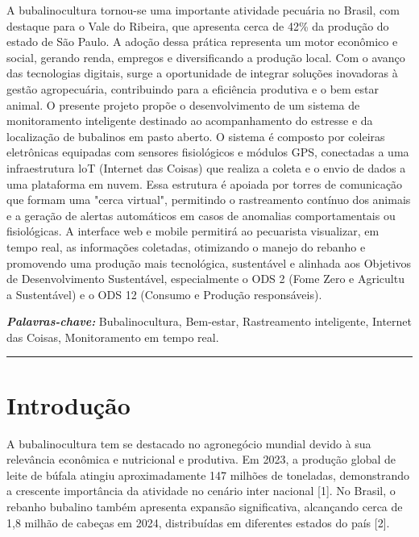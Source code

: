 \documentclass[11pt,a4paper]{article}
\begin{document}
A bubalinocultura tornou-se uma importante atividade pecuária no Brasil, com destaque para o Vale do Ribeira, que apresenta cerca de 42\% da produção do estado de São Paulo. A adoção dessa prática representa um motor econômico e social, gerando renda, empregos e diversificando a produção local. Com o avanço das tecnologias digitais, surge a oportunidade de integrar soluções inovadoras à gestão agropecuária, contribuindo para a eficiência produtiva e o bem estar animal. O presente projeto propõe o desenvolvimento de um sistema de monitoramento inteligente destinado ao acompanhamento do estresse e da localização de bubalinos em pasto aberto. O sistema é composto por coleiras eletrônicas equipadas com sensores fisiológicos e módulos GPS, conectadas a uma infraestrutura loT (Internet das Coisas) que realiza a coleta e o envio de dados a uma plataforma em nuvem. Essa estrutura é apoiada por torres de comunicação que formam uma "cerca virtual", permitindo o rastreamento contínuo dos animais e a geração de alertas automáticos em casos de anomalias comportamentais ou fisiológicas. A interface web e mobile permitirá ao pecuarista visualizar, em tempo real, as informações coletadas, otimizando o manejo do rebanho e promovendo uma produção mais tecnológica, sustentável e alinhada aos Objetivos de Desenvolvimento Sustentável, especialmente o ODS 2 (Fome Zero e Agricultu a Sustentável) e o ODS 12 (Consumo e Produção responsáveis).

\vspace{0.3cm}
\noindent\textit{\textbf{Palavras-chave:}} Bubalinocultura, Bem-estar, Rastreamento inteligente, Internet das Coisas, Monitoramento em tempo real.

\vspace{0.5cm}
\noindent\rule{\textwidth}{0.5pt}
\vspace{0.5cm}

\section{Introdução}

A bubalinocultura tem se destacado no agronegócio mundial devido à sua relevância econômica e nutricional e produtiva. Em 2023, a produção global de leite de búfala atingiu aproximadamente 147 milhões de toneladas, demonstrando a crescente importância da atividade no cenário inter nacional [1]. No Brasil, o rebanho bubalino também apresenta expansão significativa, alcançando cerca de 1,8 milhão de cabeças em 2024, distribuídas em diferentes estados do país [2].
\end{document}
